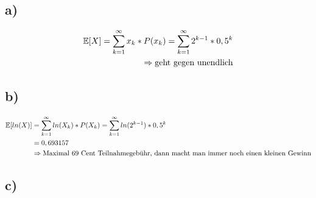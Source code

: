 \subsection*{a)}

\begin{align*}
	\mathbb{E}[X] = \sum_{k=1}^{\infty} x_k * P(x_k) = \sum_{k=1}^{\infty} 2^{k-1} * 0,5^k \\
	\Rightarrow \text{geht gegen unendlich} \\
\end{align*}


\subsection*{b)}

\begin{align*}
	\mathbb{E}[ln(X)] & = \sum_{k=1}^{\infty} ln(X_k) * P(X_k) = \sum_{k=1}^{\infty} ln(2^{k-1}) * 0,5^k \\
			& = 0,693157 \\
			& \Rightarrow \text{Maximal 69 Cent Teilnahmegebühr, dann macht man immer noch einen kleinen Gewinn} \\
\end{align*}

\subsection*{c)}
